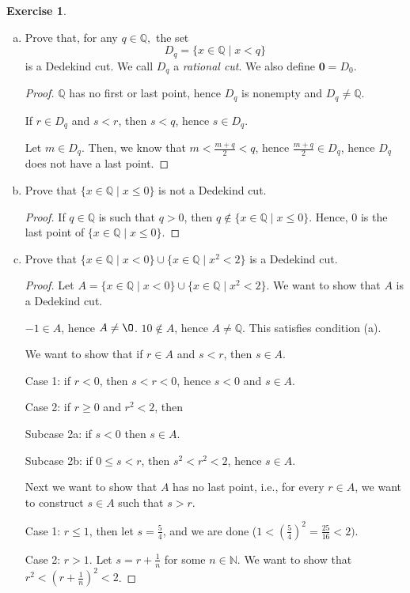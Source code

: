 \documentclass[11pt]{article}
\newcommand{\bbN}{\mathbb{N}}
\newcommand{\bbQ}{\mathbb{Q}}
\renewcommand{\emptyset}{\O}
\theoremstyle{definition}
\newtheorem{exercise}[theorem]{Exercise}
\numberwithin{equation}{subsection}
\begin{document}
\begin{exercise}
	\begin{enumerate}[(a)]
		\item Prove that, for any $q\in \bbQ,$ the set $$D_q = \{x\in\bbQ\mid x< q\}$$ is a Dedekind cut. We call $D_q$ a {\em rational cut}.  We also define  $\mathbf{0} = D_0.$
\begin{proof}
$\bbQ$ has no first or last point, hence $D_q$ is nonempty and $D_q \neq \bbQ$. 

If $r \in D_q$ and $s < r$, then $s < q$, hence $s \in D_q$.

Let $m \in D_q$. Then, we know that $m < \frac{m+q}{2} < q$, hence $\frac{m+q}{2} \in D_q$, hence $D_q$ does not have a last point. 

\renewcommand\qedsymbol{QED}
\end{proof}
		\item Prove that $\{x \in \bbQ \mid x \leq 0\}$ is not a Dedekind cut.
\begin{proof}
If $q \in \bbQ$ is such that $q > 0$, then $q \notin \{x \in \bbQ \mid x \leq 0\}$. Hence, $0$ is the last point of $\{x \in \bbQ \mid x \leq 0\}$. 

\renewcommand\qedsymbol{QED}
\end{proof}
		\item Prove that $\{x\in\bbQ\mid x<0\}\cup\{x\in\bbQ\mid x^2<2\}$ is a Dedekind cut. 
\begin{proof}
Let $A = \{x\in\bbQ\mid x<0\}\cup\{x\in\bbQ\mid x^2<2\}$. We want to show that $A$ is a Dedekind cut.

$-1 \in A$, hence $A \neq \emptyset$. $10 \notin A$, hence $A \neq \bbQ$. This satisfies condition (a).

We want to show that if $r \in A$ and $s < r$, then $s \in A$. 

Case 1: if $r<0$, then $s<r<0$, hence $s <0$ and $s \in A$.

Case 2: if $r \geq 0$ and $r^2 <2$, then

Subcase 2a: if $s<0$ then $s \in A$.

Subcase 2b: if $0 \leq s<r$, then $s^2 < r^2 < 2$, hence $s \in A$.

Next we want to show that $A$ has no last point, i.e., for every $r \in A$, we want to construct $s \in A$ such that $s>r$.

Case 1: $r\leq 1$, then let $s = \frac{5}{4}$, and we are done ($1< (\frac{5}{4})^2 = \frac{25}{16} < 2)$. 

Case 2: $r>1$. Let $s = r + \frac{1}{n}$ for some $n \in \bbN$. We want to show that $r^2 < (r+\frac{1}{n})^2 < 2$. 


\end{proof}
\end{enumerate}
\end{exercise}
\end{document}
